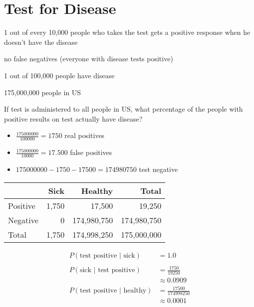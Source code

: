 \documentclass[letterpaper, landscape]{exam}
\begin{document}
  \section{Test for Disease}

  \begin{itemize*}
    \item 1 out of every 10,000 people who takes the test gets a positive
      response when he doesn't have the disease
    \item no false negatives (everyone with disease tests positive)
    \item 1 out of 100,000 people have disease
    \item 175,000,000 people in US
  \end{itemize*}

  If test is administered to all people in US, what percentage of the people
  with positive results on test actually have disease?

  \begin{solution}
    \begin{itemize}
      \item $\frac{\num{175 000 000}}{\num{100 000}} = 1750$ real positives
      \item $\frac{\num{175 000 000}}{\num{10 000}} = \num{17,500}$ false positives
      \item $\num{175 000 000} - 1750 - \num{17 500} = \num{174 980 750}$ test negative
    \end{itemize}
    \begin{tabular}[H]{lrrr}
      \toprule
               & Sick  & Healthy     & Total \\
      \midrule
      Positive & 1,750 & 17,500      & 19,250 \\
      Negative & 0     & 174,980,750 & 174,980,750 \\
      \midrule
      Total    & 1,750 & 174,998,250 & 175,000,000 \\
      \bottomrule
    \end{tabular}

    \begin{align*}
      P(\text{test positive } | \text{ sick}) &= 1.0 \\
      \\
      P(\text{sick } | \text{ test positive}) 
        & = \frac{1750}{\num{19 250}} \\
        & \approx 0.0909
      \\
      P(\text{test positive } | \text{ healthy}) 
        & = \frac{\num{17 500}}{\num{174 998 250}} \\
        & \approx 0.0001 \\
    \end{align*}

  \end{solution}
\end{document}
